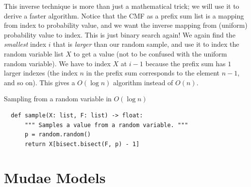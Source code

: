 \documentclass[11pt, oneside]{article}
\theoremstyle{plain}
\theoremstyle{definition}
\begin{document}
This inverse technique is more than just a mathematical trick; we will use it
to derive a faster algorithm. Notice that the CMF as a prefix sum list is a
mapping from index to probability value, and we want the inverse mapping from
(uniform) probability value to index. This is just binary search again! We
again find the \textit{smallest} index \( i \) that is \textit{larger} than
our random sample, and use it to index the random variable list \( X \) to
get a value (not to be confused with the uniform random variable). We have to
index \( X \) at \( i - 1 \) because the prefix sum has \( 1 \) larger indexes
(the index \( n \) in the prefix sum corresponds to the element \( n - 1 \),
and so on). This gives a \( O(\log n) \) algorithm instead of \( O(n) \).
\begin{algorithm}[H]
  \caption{Sampling from a random variable in \( O(\log n) \)}
  \label{alg:sample}
  \setlength{\partopsep}{-\topsep} %
  \begin{verbatim}
  def sample(X: list, F: list) -> float:
      """ Samples a value from a random variable. """
      p = random.random()
      return X[bisect.bisect(F, p) - 1]
  \end{verbatim}
\end{algorithm}

\section{Mudae Models} \label{sec:model}
\end{document}
